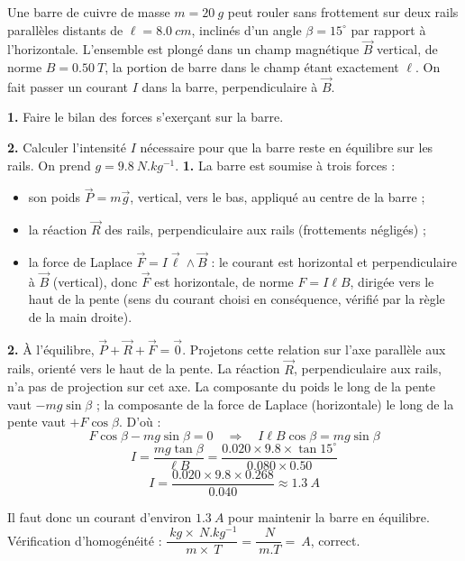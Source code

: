 \documentclass[11pt]{article}
\begin{document}
\begin{exoresolu}
Une barre de cuivre de masse $m = \SI{20}{g}$ peut rouler sans frottement sur deux rails parallèles distants de $\ell = \SI{8,0}{cm}$, inclinés d'un angle $\beta = 15^\circ$ par rapport à l'horizontale. L'ensemble est plongé dans un champ magnétique $\vec{B}$ vertical, de norme $B = \SI{0,50}{T}$, la portion de barre dans le champ étant exactement $\ell$. On fait passer un courant $I$ dans la barre, perpendiculaire à $\vec{B}$.

\textbf{1.} Faire le bilan des forces s'exerçant sur la barre.

\textbf{2.} Calculer l'intensité $I$ nécessaire pour que la barre reste en équilibre sur les rails. On prend $g = \SI{9,8}{N.kg^{-1}}$.
\tcblower
\textbf{1.} La barre est soumise à trois forces :
\begin{itemize}
\item son poids $\vec{P} = m\vec{g}$, vertical, vers le bas, appliqué au centre de la barre ;
\item la réaction $\vec{R}$ des rails, perpendiculaire aux rails (frottements négligés) ;
\item la force de Laplace $\vec{F} = I\vec{\ell}\wedge\vec{B}$ : le courant est horizontal et perpendiculaire à $\vec{B}$ (vertical), donc $\vec{F}$ est horizontale, de norme $F = I\ell B$, dirigée vers le haut de la pente (sens du courant choisi en conséquence, vérifié par la règle de la main droite).
\end{itemize}

\textbf{2.} À l'équilibre, $\vec{P} + \vec{R} + \vec{F} = \vec{0}$. Projetons cette relation sur l'axe parallèle aux rails, orienté vers le haut de la pente. La réaction $\vec{R}$, perpendiculaire aux rails, n'a pas de projection sur cet axe. La composante du poids le long de la pente vaut $-mg\sin\beta$ ; la composante de la force de Laplace (horizontale) le long de la pente vaut $+F\cos\beta$. D'où :
\[ F\cos\beta - mg\sin\beta = 0 \quad\Longrightarrow\quad I\ell B\cos\beta = mg\sin\beta \]
\[ I = \dfrac{mg\tan\beta}{\ell B} = \dfrac{\num{0,020} \times \num{9,8} \times \tan 15^\circ}{\num{0,080} \times \num{0,50}} \]
\[ I = \dfrac{\num{0,020} \times \num{9,8} \times \num{0,268}}{\num{0,040}} \approx \SI{1,3}{A} \]

Il faut donc un courant d'environ $\SI{1,3}{A}$ pour maintenir la barre en équilibre. Vérification d'homogénéité : $\dfrac{\SI{}{kg}\times\SI{}{N.kg^{-1}}}{\SI{}{m}\times\SI{}{T}} = \dfrac{\SI{}{N}}{\SI{}{m.T}} = \SI{}{A}$, correct.
\end{exoresolu}
\end{document}

